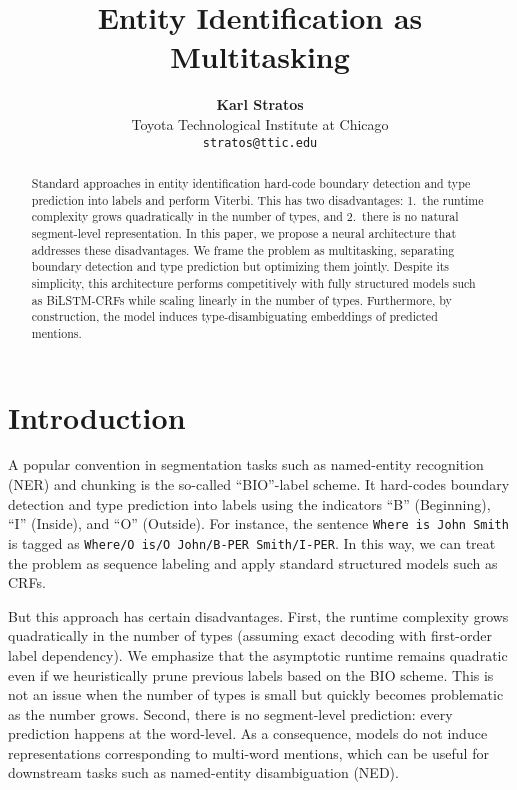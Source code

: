 \documentclass[11pt,letterpaper,UTF8]{article}
\title{Entity Identification as Multitasking\Thanks{Part of the work was done while the author was at Bloomberg L.~P.}}
\author{
  {\bf Karl Stratos} \\
  Toyota Technological Institute at Chicago \\
  {\tt stratos@ttic.edu}
  }
\date{}
\begin{document}
\maketitle

\begin{abstract}

Standard approaches in entity identification hard-code boundary detection
and type prediction into labels and perform Viterbi.
This has two disadvantages:
1.~the runtime complexity grows quadratically in the number of types, and
2.~there is no natural segment-level representation.
In this paper, we propose a neural architecture that addresses these disadvantages.
We frame the problem as multitasking, separating boundary detection and type prediction but optimizing them jointly.
Despite its simplicity, this architecture performs competitively with fully structured models such as BiLSTM-CRFs
while scaling linearly in the number of types.
Furthermore, by construction, the model induces type-disambiguating embeddings of predicted mentions.

\end{abstract}


\section{Introduction}
\label{sec:intro}

A popular convention in segmentation tasks such as named-entity recognition (NER) and chunking is the so-called ``BIO''-label scheme.
It hard-codes boundary detection and type prediction into labels using the indicators ``B'' (Beginning), ``I'' (Inside), and ``O'' (Outside).
For instance, the sentence \texttt{Where is John Smith} is tagged as \texttt{Where/O is/O John/B-PER Smith/I-PER}.
In this way, we can treat the problem as sequence labeling and apply standard structured models such as CRFs.

But this approach has certain disadvantages.
First, the runtime complexity grows quadratically in the number of types (assuming exact decoding with first-order label dependency).
We emphasize that the asymptotic runtime remains quadratic even if we heuristically prune previous labels based on the BIO scheme.
This is not an issue when the number of types is small but quickly becomes problematic as the number grows.
Second, there is no segment-level prediction: every prediction happens at the word-level.
As a consequence, models do not induce representations corresponding to multi-word mentions,
which can be useful for downstream tasks such as named-entity disambiguation (NED).
\end{document}

